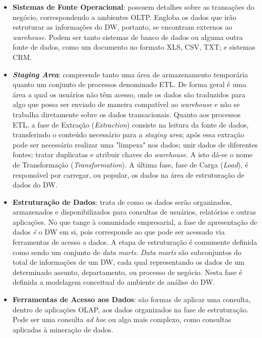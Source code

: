 \begin{itemize}
    \item \textbf{Sistemas de Fonte Operacional}: possuem detalhes sobre as transações do negócio, correspondendo a ambientes OLTP. Engloba os dados que irão estruturar as informações do DW, portanto, se encontram externos ao \textit{warehouse}. Podem ser tanto sistemas de banco de dados ou alguma outra fonte de dados, como um documento no formato XLS, CSV, TXT; e sistemas CRM.
    \item \textbf{\textit{Staging Area}}: compreende tanto uma área de armazenamento temporária quanto um conjunto de processos denominado ETL. De forma geral é uma área a qual os usuários não têm acesso, onde os dados são traduzidos para algo que possa ser enviado de maneira compatível ao \textit{warehouse} e não se trabalha diretamente sobre os dados transacionais. Quanto aos processos ETL, a fase de Extração (\textit{Extraction}) consiste na leitura da fonte de dados, transferindo o conteúdo necessário para a \textit{staging area}; após essa extração pode ser necessário realizar uma "limpeza" nos dados; unir dados de diferentes fontes; tratar duplicatas e atribuir chaves do \textit{warehouse}. A isto dá-se o nome de Transformação (\textit{Transformation}). A última fase, fase de Carga (\textit{Load}), é responsável por carregar, ou popular, os dados na área de estruturação de dados do DW.
    \item \textbf{Estruturação de Dados}: trata de como os dados serão organizados, armazenados e disponibilizados para consultas de usuários, relatórios e outras aplicações. No que tange à comunidade empresarial, a fase de apresentação de dados \textit{é} o DW em si, pois corresponde ao que pode ser acessado via ferramentas de acesso a dados. A etapa de estruturação é comumente definida como sendo um conjunto de \textit{data marts}. \textit{Data marts} são subconjuntos do total de informações de um DW, cada qual representando os dados de um determinado assunto, departamento, ou processo de negócio. Nesta fase é definida a modelagem conceitual do ambiente de análise do DW.
    \item \textbf{Ferramentas de Acesso aos Dados}: são formas de aplicar uma consulta, dentro de aplicações OLAP, aos dados organizados na fase de estruturação. Pode ser uma consulta \textit{ad hoc} ou algo mais complexo, como consultas aplicadas à mineração de dados.
    
\end{itemize}

